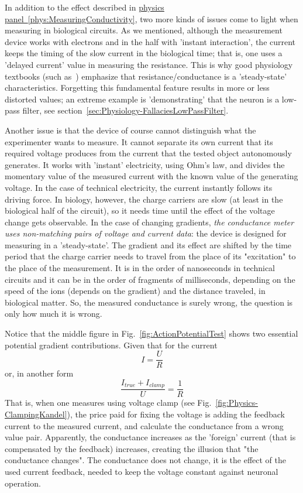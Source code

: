 {
In addition to the effect described in \hyperlink{phys:MeasuringConductivity}{physics panel~\ref{phys:MeasuringConductivity}}, two more kinds of issues come to light when measuring in biological circuits. As we mentioned, although the measurement device
works with electrons and in the half with 'instant interaction',
the current keeps the timing of the slow current in the biological time; that is, one uses a 'delayed current' value in measuring
the resistance. This is why good physiology textbooks (such as~\cite{JohnstonWuNeurophysiology:1995}) emphasize that 
resistance/conductance is a 'steady-state' characteristics.
Forgetting this fundamental feature results in more or less
distorted values; an extreme example is 'demonstrating' that
the neuron is a low-pass filter, see section~\ref{sec:Physiology-FallaciesLowPassFilter}.

Another issue is that the device of course cannot distinguish what the
experimenter wants to measure. It cannot separate its own current that its required voltage produces
from the current that the tested object autonomously generates.
It works with 'instant' electricity, 
using Ohm's law, and divides the momentary value of the measured current with the known value of
the generating voltage. In the case of technical electricity, the 
current instantly follows its driving force.
In biology, however, the charge carriers are slow (at least in the biological half of the circuit), so it needs time until the effect of
the voltage change gets observable. In the case of changing gradients, \textit{the conductance meter uses non-matching pairs of voltage and current data}: the device is designed for measuring in a 'steady-state'.
The gradient and its effect are shifted by the time period that the charge carrier needs to travel from the place of its "excitation"
to the place of the measurement.
It is in the order of nanoseconds in technical circuits and it can be in the order of fragments of milliseconds, depending on the speed of the ions (depends on the gradient) and the distance traveled, in biological matter.
So, the measured conductance is surely wrong, the question is only how much it is wrong. 
}

Notice that the middle figure in Fig.~\ref{fig:ActionPotentialTest} shows two essential potential gradient
contributions. Given that for the current 
\[
I=\frac{U}{R}
\]
or, in another form
\[
\frac{I_{true}+I_{clamp}}{U}=\frac{1}{R}
\]
That is, when one measures using voltage clamp (see Fig.~\ref{fig:Physics-ClampingKandel}),
the price paid for fixing the voltage is adding the feedback current
to the measured current, and calculate the conductance from a wrong
value pair. Apparently, the conductance increases as the 'foreign' current (that is compensated by the feedback) increases,
creating the illusion that "the conductance changes".
The conductance does not change, it is the effect 
of the used current feedback, needed to keep the voltage constant
against neuronal operation.

